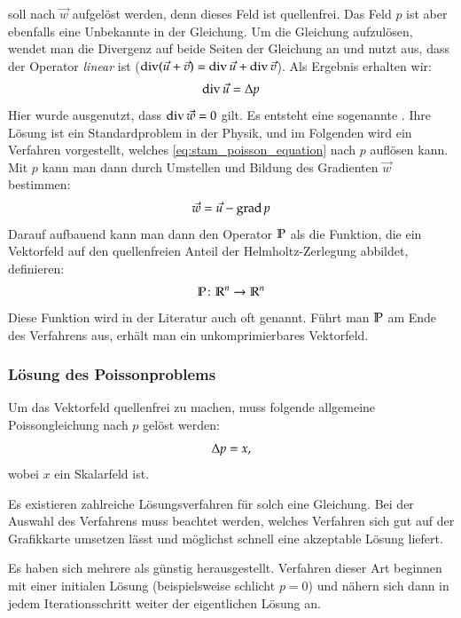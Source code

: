  soll nach $\vec{w}$ aufgelöst
werden, denn dieses Feld ist quellenfrei. Das Feld $p$ ist aber
ebenfalls eine Unbekannte in der Gleichung. Um die Gleichung
aufzulösen, wendet man die Divergenz auf beide Seiten der Gleichung an
und nutzt aus, dass der Operator \emph{linear} ist ($\operatorname*{div}
(\vec{u} + \vec{v}) = \operatorname*{div} \vec{u} + \operatorname*{div} \vec{v}$).
Als Ergebnis erhalten wir:
\begin{equation}
\label{eq:stam_poisson_equation}
\operatorname*{div} \vec{u} = \Delta p
\end{equation}
Hier wurde ausgenutzt, dass $\operatorname*{div} \vec{w} = 0$ gilt. Es
entsteht eine sogenannte . Ihre
Lösung ist ein Standardproblem in der Physik, und im Folgenden wird
ein Verfahren vorgestellt, welches \cref{eq:stam_poisson_equation} nach
$p$ auflösen kann. Mit $p$ kann man dann durch Umstellen und Bildung
des Gradienten $\vec{w}$ bestimmen:
\begin{equation}
\vec{w} = \vec{u} - \operatorname*{grad} p
\end{equation}
Darauf aufbauend kann man dann den Operator $\mathbb{P}$ als
die Funktion, die ein Vektorfeld auf den quellenfreien Anteil der
Helmholtz-Zerlegung abbildet, definieren:
\begin{equation}
\mathbb{P} \colon \mathbb{R}^n \to \mathbb{R}^n
\end{equation}
Diese Funktion wird in der Literatur auch oft
 genannt. Führt man $\mathbb{P}$ am
Ende des Verfahrens aus, erhält man ein unkomprimierbares Vektorfeld.

\subsubsection{Lösung des Poissonproblems}

Um das Vektorfeld quellenfrei zu machen, muss folgende allgemeine
Poissongleichung nach $p$ gelöst werden:
\begin{equation}
\Delta{p} = x,
\end{equation}
wobei $x$ ein Skalarfeld ist.

Es existieren zahlreiche Lösungsverfahren für solch eine
Gleichung. Bei der Auswahl des Verfahrens muss beachtet werden,
welches Verfahren sich gut auf der Grafikkarte umsetzen lässt und
möglichst schnell eine akzeptable Lösung liefert.

Es haben sich mehrere  als
günstig herausgestellt. Verfahren dieser Art beginnen mit einer initialen Lösung
(beispielsweise schlicht $p=0$) und nähern sich dann in jedem Iterationsschritt
weiter der eigentlichen Lösung an.

